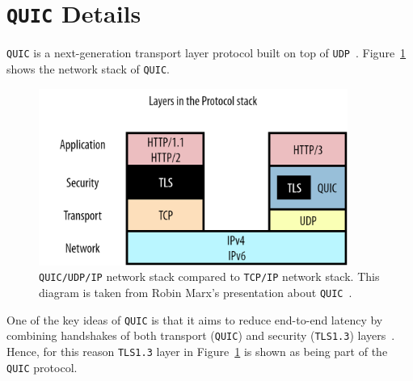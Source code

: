 \documentclass[12pt,a4paper,twoside,openright]{report}
\begin{document}
\section{\texttt{QUIC} Details} \label{QUIC_details_section}

\texttt{QUIC} is a next-generation transport layer protocol built on top of \texttt{UDP}~\cite{chromium_blog_about_quic}.
Figure~\ref{fig:QUIC_network_stack} shows the network stack of \texttt{QUIC}.

    \begin{figure}[ht]
    \centering
    \includegraphics[width=0.9\textwidth]{figs/Layers_of_networking_stack.png}
    \caption[\texttt{QUIC/UDP/IP} network stack compared to \texttt{TCP/IP} network stack]{\texttt{QUIC/UDP/IP} network stack compared to \texttt{TCP/IP} network stack. This diagram is taken from Robin Marx's presentation about \texttt{QUIC}~\cite{head-of-line-blocking-in-quic-and-http-3-the-details}.}
    \label{fig:QUIC_network_stack}
    \end{figure}

One of the key ideas of \texttt{QUIC} is that it aims to reduce end-to-end latency by combining handshakes of both transport (\texttt{QUIC}) and security (\texttt{TLS1.3}) layers~\cite{Google_QUIC_protocol_moving_the_web_from_TCP_to_UDP, HTTP_3_the_past_the_present_and_the_future}. 
Hence, for this reason \texttt{TLS1.3} layer in Figure~\ref{fig:QUIC_network_stack} is shown as being part of the \texttt{QUIC} protocol. 

%
\end{document}
